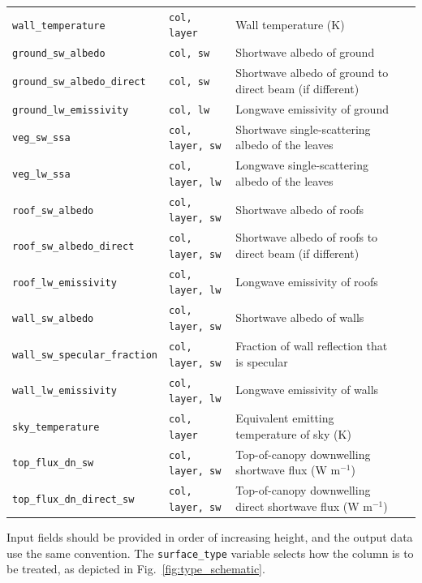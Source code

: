 \documentclass[a4,oneside]{article}
\def\codesize{\small}
\def\codetabsize{\footnotesize}
\def\code#1{{\codesize\texttt{#1}}}
\def\codetab#1{{\codetabsize\texttt{#1}}}
\begin{document}
\begin{center}
\begin{longtable}{llLp{8cm}}
\codetab{wall\_temperature} & \codetab{col, layer} & Wall temperature (K) \\
%
\codetab{ground\_sw\_albedo} & \codetab{col, sw} & Shortwave albedo of ground \\
\codetab{ground\_sw\_albedo\_direct} & \codetab{col, sw} & Shortwave albedo of ground to direct beam (if different)\\
\codetab{ground\_lw\_emissivity} & \codetab{col, lw} & Longwave emissivity of ground \\
%
\codetab{veg\_sw\_ssa} & \codetab{col, layer, sw} & Shortwave single-scattering albedo of the leaves \\
\codetab{veg\_lw\_ssa} & \codetab{col, layer, lw} & Longwave single-scattering albedo of the leaves \\
%
\codetab{roof\_sw\_albedo} & \codetab{col, layer, sw} & Shortwave albedo of roofs \\
\codetab{roof\_sw\_albedo\_direct} & \codetab{col, layer, sw} & Shortwave albedo of roofs to direct beam (if different)\\
\codetab{roof\_lw\_emissivity} & \codetab{col, layer, lw} & Longwave emissivity of roofs \\
%
\codetab{wall\_sw\_albedo} & \codetab{col, layer, sw} & Shortwave albedo of walls \\
\codetab{wall\_sw\_specular\_fraction} & \codetab{col, layer, sw} & Fraction of wall reflection that is specular \\
\codetab{wall\_lw\_emissivity} & \codetab{col, layer, lw} & Longwave emissivity of walls \\
%
\codetab{sky\_temperature} & \codetab{col, layer} & Equivalent emitting temperature of sky (K) \\
\codetab{top\_flux\_dn\_sw} & \codetab{col, layer, sw} & Top-of-canopy downwelling shortwave flux (W m$^{-1}$) \\
\codetab{top\_flux\_dn\_direct\_sw} & \codetab{col, layer, sw} & Top-of-canopy downwelling direct shortwave flux (W m$^{-1}$) \\
\hline
\end{longtable}
\end{center}

Input fields should be provided in order of increasing height, and the
output data use the same convention. The \code{surface\_type} variable
selects how the column is to be treated, as depicted in
Fig.\ \ref{fig:type_schematic}.
\end{document}
